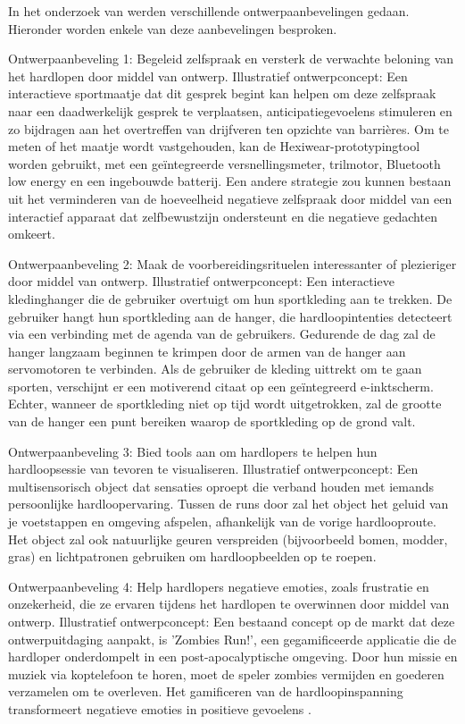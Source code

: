     In het onderzoek van \textcite{Menheere2020} werden verschillende ontwerpaanbevelingen gedaan. Hieronder worden enkele van deze aanbevelingen besproken.


    Ontwerpaanbeveling 1: Begeleid zelfspraak en versterk de verwachte beloning van het hardlopen door middel van ontwerp. 
    Illustratief ontwerpconcept: Een interactieve sportmaatje dat dit gesprek begint kan helpen om deze zelfspraak naar een daadwerkelijk gesprek te verplaatsen, 
    anticipatiegevoelens stimuleren en zo bijdragen aan het overtreffen van drijfveren ten opzichte van barrières. 
    Om te meten of het maatje wordt vastgehouden, kan de Hexiwear-prototypingtool worden gebruikt, met een geïntegreerde versnellingsmeter, 
    trilmotor, Bluetooth low energy en een ingebouwde batterij. Een andere strategie zou kunnen bestaan uit het verminderen van de hoeveelheid 
    negatieve zelfspraak door middel van een interactief apparaat dat zelfbewustzijn ondersteunt en die negatieve gedachten omkeert.


    Ontwerpaanbeveling 2: Maak de voorbereidingsrituelen interessanter of plezieriger door middel van ontwerp. 
    Illustratief ontwerpconcept: Een interactieve kledinghanger die de gebruiker overtuigt om hun sportkleding aan te trekken. 
    De gebruiker hangt hun sportkleding aan de hanger, die hardloopintenties detecteert via een verbinding met de agenda van de gebruikers. 
    Gedurende de dag zal de hanger langzaam beginnen te krimpen door de armen van de hanger aan servomotoren te verbinden. 
    Als de gebruiker de kleding uittrekt om te gaan sporten, verschijnt er een motiverend citaat op een geïntegreerd e-inktscherm. 
    Echter, wanneer de sportkleding niet op tijd wordt uitgetrokken, zal de grootte van de hanger een punt bereiken waarop de sportkleding op de grond valt.



    Ontwerpaanbeveling 3: Bied tools aan om hardlopers te helpen hun hardloopsessie van tevoren te visualiseren. 
    Illustratief ontwerpconcept: Een multisensorisch object dat sensaties oproept die verband houden met iemands persoonlijke hardloopervaring. 
    Tussen de runs door zal het object het geluid van je voetstappen en omgeving afspelen, afhankelijk van de vorige hardlooproute. 
    Het object zal ook natuurlijke geuren verspreiden (bijvoorbeeld bomen, modder, gras) en lichtpatronen gebruiken om hardloopbeelden op te roepen.


    Ontwerpaanbeveling 4: Help hardlopers negatieve emoties, zoals frustratie en onzekerheid, die ze ervaren tijdens het hardlopen te overwinnen 
    door middel van ontwerp. 
    Illustratief ontwerpconcept: Een bestaand concept op de markt dat deze ontwerpuitdaging aanpakt, is 'Zombies Run!', 
    een gegamificeerde applicatie die de hardloper onderdompelt in een post-apocalyptische omgeving. 
    Door hun missie en muziek via koptelefoon te horen, moet de speler zombies vermijden en goederen verzamelen om te overleven. 
    Het gamificeren van de hardloopinspanning transformeert negatieve emoties in positieve gevoelens \autocite{Menheere2020}.


